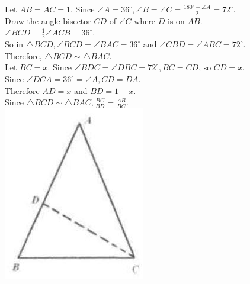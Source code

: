 \documentclass[10pt]{article}
\begin{document}
Let \(A B=A C=1\). Since \(\angle A=36^{\circ}, \angle B=\angle C=\frac{180^{\circ}-\angle A}{2}=72^{\circ}\).\\
Draw the angle bisector \(C D\) of \(\angle C\) where \(D\) is on \(A B\).\\
\(\angle B C D=\frac{1}{2} \angle A C B=36^{\circ}\).\\
So in \(\triangle B C D, \angle B C D=\angle B A C=36^{\circ}\) and \(\angle C B D=\angle A B C=72^{\circ}\).\\
Therefore, \(\triangle B C D \sim \triangle B A C\).\\
Let \(B C=x\). Since \(\angle B D C=\angle D B C=72^{\circ}, B C=C D\), so \(C D=x\).\\
Since \(\angle D C A=36^{\circ}=\angle A, C D=D A\).\\
Therefore \(A D=x\) and \(B D=1-x\).\\
Since \(\triangle B C D \sim \triangle B A C, \frac{B C}{B D}=\frac{A B}{B C}\).\\
\includegraphics[max width=\textwidth, center]{2025_04_17_97bc1f7e44d93c271a88g-062(1)}
\end{document}
